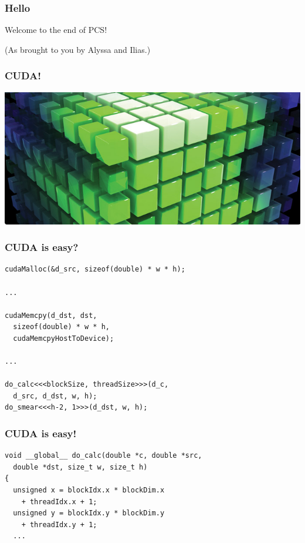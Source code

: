 \documentclass{beamer}
\begin{document}
\begin{frame}
 \frametitle{Hello}
 Welcome to the end of PCS!

 (As brought to you by Alyssa and Ilias.)
\end{frame}

\begin{frame}
 \frametitle{CUDA!}
 \includegraphics[width=\textwidth]{Featureimage-cuda-technology.jpg}
\end{frame}

\begin{frame}[fragile]
 \frametitle{CUDA is easy?}
\begin{verbatim}
cudaMalloc(&d_src, sizeof(double) * w * h);

...

cudaMemcpy(d_dst, dst,
  sizeof(double) * w * h,
  cudaMemcpyHostToDevice);

...

do_calc<<<blockSize, threadSize>>>(d_c,
  d_src, d_dst, w, h);
do_smear<<<h-2, 1>>>(d_dst, w, h);
\end{verbatim}
\end{frame}

\begin{frame}[fragile]
 \frametitle{CUDA is easy!}
\begin{verbatim}
void __global__ do_calc(double *c, double *src,
  double *dst, size_t w, size_t h)
{
  unsigned x = blockIdx.x * blockDim.x
    + threadIdx.x + 1;
  unsigned y = blockIdx.y * blockDim.y
    + threadIdx.y + 1;
  ...
\end{verbatim}
\end{frame}
\end{document}
